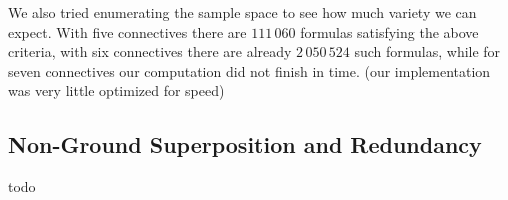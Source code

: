 We also tried enumerating the sample space to see how much variety we can expect.
With five connectives there are $111\,060$ formulas satisfying the above criteria,
with six connectives there are already $2\,050\,524$ such formulas,
while for seven connectives our computation did not finish in time.
(our implementation was very little optimized for speed)





\subsection{Non-Ground Superposition and Redundancy}

todo


